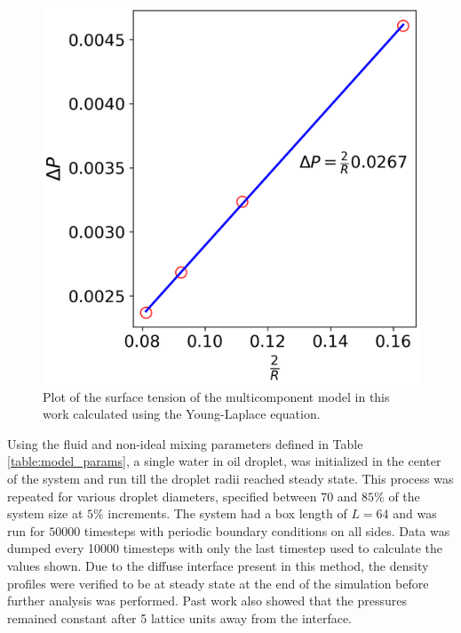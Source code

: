 \begin{figure}[h]
    \centering
    \includegraphics[scale = 0.5]{figures/model_validation/surface_tension.png}
    \caption{Plot of the surface tension of the multicomponent model in this work calculated using the 
    Young-Laplace equation.}
    \label{fig:young_laplace_valid}
\end{figure}

Using the fluid and non-ideal mixing parameters defined in Table \ref{table:model_params}, a single water in oil 
droplet, was initialized in the center of the system and run till the droplet radii reached steady state. 
This process was repeated for various droplet diameters, specified between $70$ and $85 \%$ of the system size at $5\%$ 
increments. The system had a box length of $L = 64$ and was run for $50000$ timesteps with periodic boundary conditions 
on all sides. Data was dumped every 10000 timesteps with only the last timestep used to calculate the values shown. Due 
to the diffuse interface present in this method, the density profiles were verified to be at steady state at the end of 
the simulation before further analysis was performed. \cite{frijters_effects_2012} Past work also showed that the 
pressures remained constant after 5 lattice units away from the interface. \cite{frijters_effects_2012} 

